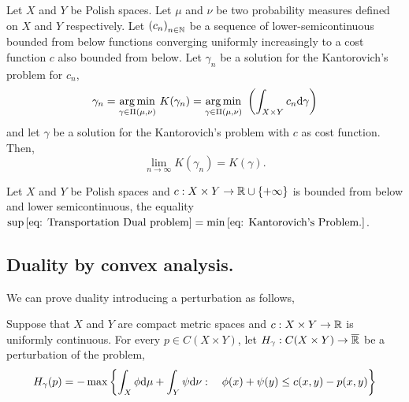 \begin{lemma}[Stability]
	Let $X$ and $Y$ be Polish spaces. Let $\mu$ and $\nu$ be two probability measures defined on $X$ and $Y$ respectively. Let $\left( c_n \right)_{n\in \mathbb{N}}$ be a sequence of lower-semicontinuous bounded from below functions converging uniformly increasingly to a cost function $c$ also bounded from below. Let $\gamma_n$ be a solution for the Kantorovich's problem for $c_n$,
	\begin{equation*}
		\gamma_n=\displaystyle {\underset {\gamma\in \Pi(\mu, \nu)}{\operatorname {arg\,min} }}\ K(\gamma_n)=\displaystyle {\underset {\gamma\in \Pi(\mu, \nu)}{\operatorname {arg\,min} }}\  \left( \int_{X\times Y}c_n\mathrm{d}\gamma \right)
	\end{equation*}
	and let $\gamma$ be a solution for the Kantorovich's problem with $c$ as cost function. Then,
	\begin{equation*}
		\lim_{n\rightarrow \infty}K(\gamma_n)=K(\gamma).
	\end{equation*}
\end{lemma}

\begin{theorem}
	Let $X$ and $Y$ be Polish spaces and $c:X\times Y\rightarrow \mathbb{R} \cup\left\lbrace +\infty \right\rbrace$ is bounded from below and lower semicontinuous, the equality $\sup\eqref{eq: Transportation Dual problem}=\min\eqref{eq: Kantorovich's Problem.}$.
\end{theorem}	
\subsection{Duality by convex analysis.}
We can prove duality introducing a perturbation as follows, 
\begin{definition}
	\label{def: H perturbation}
	Suppose that $X$ and $Y$ are compact metric spaces and $c:X\times Y\rightarrow \mathbb{R}$ is uniformly continuous. For every $p\in C(X\times Y)$, let $H_\gamma:C(X\times Y)\rightarrow \overline{\mathbb{R}}$ be a perturbation of the problem,
	\begin{equation}
	H_\gamma(p)=-\max\left\lbrace \int_X\phi \mathrm{d}\mu + \int_Y\psi \mathrm{d}\nu: \quad \phi(x)+\psi(y)\leq c(x,y)-p(x,y) \right\rbrace
	\end{equation}	
\end{definition}

